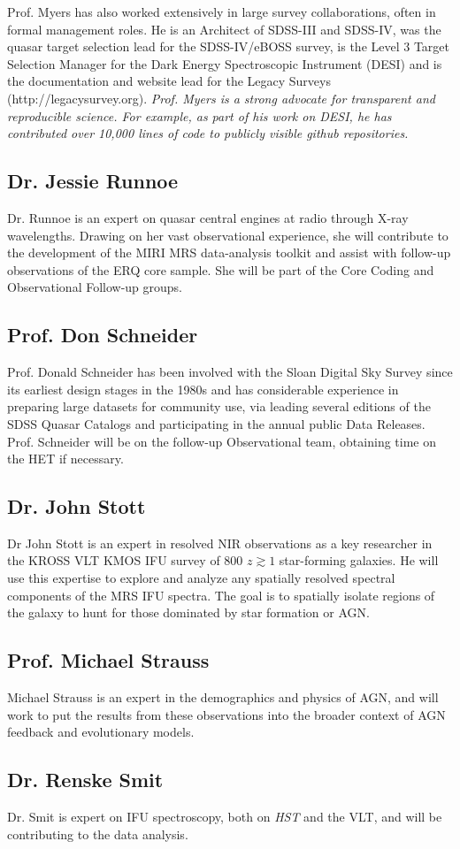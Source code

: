 \documentclass[11pt,a4paper]{article}
\begin{document}
\smallskip \smallskip
\noindent
Prof. Myers has also worked extensively in large survey
collaborations, often in formal management roles. He is an Architect
of SDSS-III and SDSS-IV, was the quasar target selection lead for the
SDSS-IV/eBOSS survey, is the Level 3 Target Selection Manager for the
Dark Energy Spectroscopic Instrument (DESI) and is the documentation
and website lead for the Legacy Surveys
(http://legacysurvey.org). {\it Prof. Myers is a strong advocate for
transparent and reproducible science. For example, as part of his work
on DESI, he has contributed over 10,000 lines of code to publicly
visible github repositories.}


\subsection*{Dr. Jessie Runnoe}
Dr. Runnoe is an expert on quasar central engines at radio through
X-ray wavelengths.  Drawing on her vast observational experience, she
will contribute to the development of the MIRI MRS data-analysis
toolkit and assist with follow-up observations of the ERQ core sample.
She will be part of the Core Coding and Observational Follow-up
groups.


\subsection*{Prof. Don Schneider}
Prof. Donald Schneider has been involved with the Sloan Digital Sky
Survey since its earliest design stages in the 1980s and has
considerable experience in preparing large datasets for community use,
via leading several editions of the SDSS Quasar Catalogs and
participating in the annual public Data Releases. Prof. Schneider will
be on the follow-up Observational team, obtaining time on the HET if
necessary.


\subsection*{Dr. John Stott}
Dr John Stott is an expert in resolved NIR observations as a key
researcher in the KROSS VLT KMOS IFU survey of 800 $z\gtrsim1$
star-forming galaxies. He will use this expertise to explore and
analyze any spatially resolved spectral components of the MRS IFU
spectra. The goal is to spatially isolate regions of the galaxy to
hunt for those dominated by star formation or AGN.


\subsection*{Prof. Michael  Strauss}
Michael Strauss is an expert in the demographics and physics of AGN, and will work to 
put the results from these observations into the broader context of AGN feedback and 
evolutionary models. 


\subsection*{Dr. Renske Smit}		
Dr. Smit is expert on IFU spectroscopy, both on {\it HST} and the VLT,
and will be contributing to the data analysis.

\end{document}
